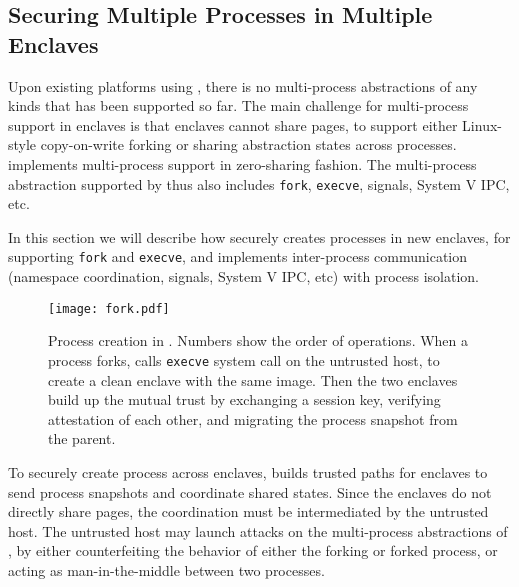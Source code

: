 \subsection{Securing Multiple Processes in Multiple Enclaves}
\label{sec:gsgx:multiproc}

Upon existing platforms using \sgx{}, there is no
multi-process abstractions of any kinds that has been supported so far.
The main challenge for multi-process support in enclaves
is that enclaves cannot share pages,
to support either Linux-style copy-on-write forking or
sharing abstraction states across processes.
\graphene{} implements multi-process support
in zero-sharing fashion.
The multi-process abstraction supported by \graphene{} thus also \graphenesgx{}
includes {\tt fork}, {\tt execve}, signals, System V IPC, etc.

In this section we will describe how \graphenesgx{} securely creates
processes in new enclaves,
for supporting {\tt fork} and {\tt execve},
and implements inter-process communication
(namespace coordination, signals, System V IPC, etc)
with process isolation.


\begin{figure}[t!]
\centering
\texttt{[image: fork.pdf]}
\footnotesize
\caption[Process creation in \graphenesgx{}]
{Process creation in \graphenesgx{}.
Numbers show the order of operations.
When a process forks, \graphenesgx{} calls {\tt execve} system call
on the untrusted host,
to create a clean enclave with the same \libos{} image.
Then the two enclaves build up the mutual trust by
exchanging a session key, verifying attestation of each other,
and migrating the process snapshot from the parent.}
\label{fig:graphene:sgx-fork}
\end{figure}

To securely create process across enclaves,
\graphenesgx{} builds trusted paths for enclaves to send process snapshots and coordinate shared states.
Since the enclaves do not directly share pages,
the coordination must be intermediated by the untrusted host.
The untrusted host may launch attacks on the multi-process abstractions of \graphenesgx{},
by either counterfeiting the behavior of either the forking or forked process,
or acting as man-in-the-middle between two processes.

